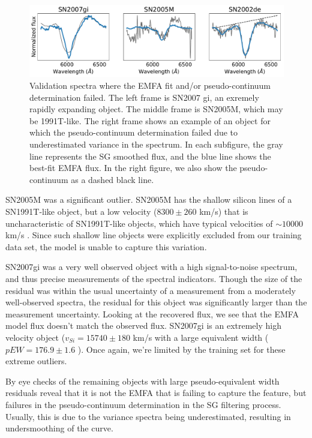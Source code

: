 \begin{figure}[htbp]
    \centering
    \includegraphics[width=\textwidth]{figures/si_feat_pca/fit_failures.pdf}
    \caption{Validation spectra where the EMFA fit and/or pseudo-continuum determination failed. The left frame is SN2007 gi, an exremely rapidly expanding object. The middle frame is SN2005M, which may be 1991T-like. The right frame shows an example of an object for which the pseudo-continuum determination failed due to underestimated variance in the spectrum. In each subfigure, the gray line represents the SG smoothed flux, and the blue line shows the best-fit EMFA flux. In the right figure, we also show the pseudo-continuum as a dashed black line.}
    \label{valid_failures}
\end{figure}

SN2005M was a significant outlier. SN2005M has the shallow silicon lines of a SN1991T-like object, but a low velocity ($8300\pm 260$ km/s) that is uncharacteristic of SN1991T-like objects, which have typical velocities of $\sim 10000$ km/s \citep{blondin_spectroscopic_2012}. Since such shallow line objects were explicitly excluded from our training data set, the model is unable to capture this variation.

SN2007gi was a very well observed object with a high signal-to-noise spectrum, and thus precise measurements of the spectral indicators. Though the size of the residual was within the usual uncertainty of a measurement from a moderately well-observed spectra, the residual for this object was significantly larger than the measurement uncertainty. Looking at the recovered flux, we see that the EMFA model flux doesn't match the observed flux. SN2007gi is an extremely high velocity object ($v_{Si}=15740\pm180$ km/s with a large equivalent width ($pEW=176.9\pm1.6$ \angstrom). Once again, we're limited by the training set for these extreme outliers.

By eye checks of the remaining objects with large pseudo-equivalent width residuals reveal that it is not the EMFA that is failing to capture the feature, but failures in the pseudo-continuum determination in the SG filtering process. Usually, this is due to the variance spectra being underestimated, resulting in undersmoothing of the curve.

